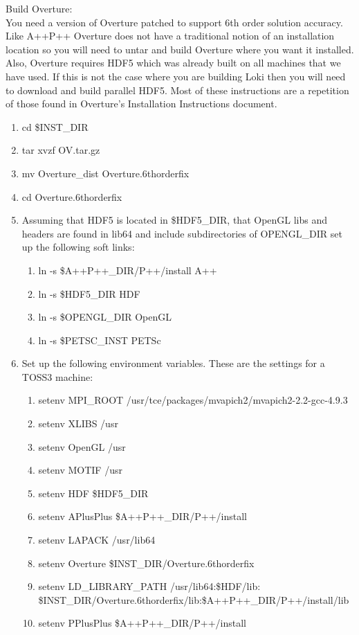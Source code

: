 \documentclass[11pt]{amsart}
\begin{document}
Build Overture: \\
You need a version of Overture patched to support 6th order solution accuracy.
Like A++P++ Overture does not have a traditional notion of an installation
location so you will need to untar and build Overture where you want it
installed.  Also, Overture requires HDF5 which was already built on all
machines that we have used.  If this is not the case where you are building
Loki then you will need to download and build parallel HDF5.  Most of these
instructions are a repetition of those found in Overture's Installation
Instructions document.
\begin{enumerate}
\item cd \$INST\_DIR
\item tar xvzf OV.tar.gz
\item mv Overture\_dist Overture.6thorderfix
\item cd Overture.6thorderfix
\item Assuming that HDF5 is located in \$HDF5\_DIR, that OpenGL libs and
headers are found in lib64 and include subdirectories of OPENGL\_DIR set up the
following soft links:
\begin{enumerate}
\item ln -s \$A++P++\_DIR/P++/install A++
\item ln -s \$HDF5\_DIR HDF
\item ln -s \$OPENGL\_DIR OpenGL
\item ln -s \$PETSC\_INST PETSc
\end{enumerate}
\item Set up the following environment variables.  These are the settings for a
TOSS3 machine:
\begin{enumerate}
\item setenv MPI\_ROOT /usr/tce/packages/mvapich2/mvapich2-2.2-gcc-4.9.3
\item setenv XLIBS /usr
\item setenv OpenGL /usr
\item setenv MOTIF /usr
\item setenv HDF \$HDF5\_DIR
\item setenv APlusPlus \$A++P++\_DIR/P++/install
\item setenv LAPACK /usr/lib64
\item setenv Overture \$INST\_DIR/Overture.6thorderfix
\item setenv LD\_LIBRARY\_PATH /usr/lib64:\$HDF/lib: \\
\$INST\_DIR/Overture.6thorderfix/lib:\$A++P++\_DIR/P++/install/lib
\item setenv PPlusPlus \$A++P++\_DIR/P++/install

\end{enumerate}
\end{enumerate}
\end{document}
